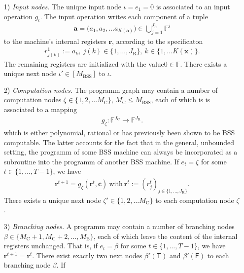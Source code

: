 \documentclass[conference]{IEEEtran}
\def\FF{{\mathbb F}}
\newcommand{\BSS}{\mathrm{BSS}}
\begin{document}
	\begin{itemize}	\item[1)] \emph{Input nodes.} The unique input node \(\iota = e_1 = 0\) is associated to an 
						input operation \(g_\iota\). The input operation writes each component of a tuple 
						\begin{align*} 	\bm{a} = \big(a_1,a_2,\ldots a_{K({\bm{a}})}\big) \in \bigcup_{j=1}^{J_{\mathrm{R}}} \FF^{j}
						\end{align*}
						to the machine's internal registers \(\bm{r}\), according to the specificaton
						\begin{align*}	r^1_{j(k)} := a_k ,~ j(k)\in \{1,\ldots,J_{\mathrm{R}}\},~ k\in \{1,\ldots K(\bm{x})\}.   
						\end{align*}
						The remaining registers are initialized with the value\linebreak \(0 \in \FF\).
						There exists a unique next node \(\iota' \in [M_\BSS]\) to \(\iota\).
					\item[2)] \emph{Computation nodes.} The programm graph may contain a number of computation nodes \(\zeta \in \{1,2,\ldots M_{\mathrm{C}}\}\),    
						\linebreak \(M_{\mathrm{C}} \leq M_{\BSS}\), each of which is 
						is associated to a mapping 
						\begin{align*} 	g_\zeta : \FF^{J_{\mathrm{C}}}\rightarrow \FF^{J_{\mathrm{R}}}. 
						\end{align*} 
						which is either polynomial, rational or has previously been shown to be BSS computable. The latter accounts for the fact that in the general, 
						unbounded setting, the programm of some BSS machine can always be incorporated as a subroutine into the programm of another BSS machine.
						If \(e_t = \zeta\) for some \(t\in\{1,\ldots, T-1\}\), we have
						\begin{align*}  \bm{r}^{t+1} = g_{\zeta}(\bm{r}^t,\bm{c})~\text{with}~\bm{r}^t := (r_j^t)_{j\in\{1,\ldots,J_{\mathrm{R}}\}}.
						\end{align*}
						There exists a unique next node \(\zeta' \in \{1,2,\ldots M_{\mathrm{C}}\}\) to each computation node \(\zeta\).
					\item[3)] \emph{Branching nodes.}  A programm may contain a number of branching nodes \(\beta \in \{M_{\mathrm{C}} + 1, M_{\mathrm{C}} + 2,\ldots, M_\mathrm{B}\}\), 
						each of which leave the content of the internal registers unchanged. That is, if \(e_t = \beta\) for some \(t\in\{1,\ldots, T-1\}\), we have
						\(\bm{r}^{t+1} = \bm{r}^{t}\). There exist exactly two next nodes \(\beta'(\mathsf{T})\) and \(\beta'(\mathsf{F})\) to each branching node \(\beta\). If 

\end{itemize}
\end{document}
